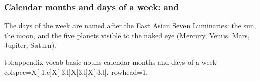 \documentclass[../nihongo-gakushuu-kyouzai.tex]{subfiles}
\begin{document}
\subsubsection{Calendar months and days of a week:  and }
The days of the week are named after the East Asian Seven Luminaries: the sun, the moon, and the five planets visible to the naked eye (Mercury, Venus, Mars, Jupiter, Saturn).

{tbl:appendix-vocab-basic-nouns-calendar-months-and-days-of-a-week}  %
{
    colspec={X[-1,c]X[-3,l]X[3,l]X[-3,l]},
    rowhead=1,
}  %
\end{document}
